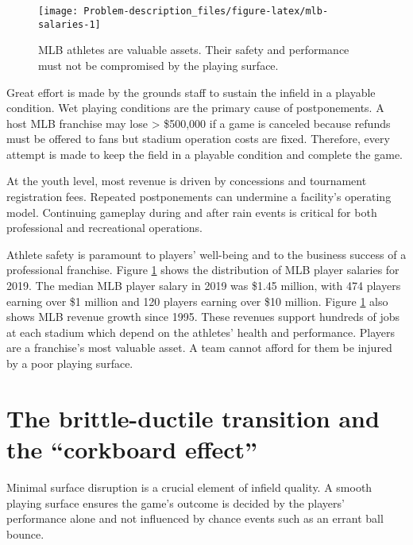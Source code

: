 \documentclass[
  letterpaper,
  openany]{book}
\begin{document}
\begin{figure}

{\centering \texttt{[image: Problem-description\_files/figure-latex/mlb-salaries-1]} 

}

\caption[Financial implications of infield safety]{MLB athletes are valuable assets. Their safety and performance must not be compromised by the playing surface.}\label{fig:mlb-salaries}
\end{figure}

Great effort is made by the grounds staff to sustain the infield in a playable condition.
Wet playing conditions are the primary cause of postponements.
A host MLB franchise may lose \textgreater{} \$500,000 if a game is canceled because refunds must be offered to fans but stadium operation costs are fixed.
Therefore, every attempt is made to keep the field in a playable condition and complete the game.

At the youth level, most revenue is driven by concessions and tournament registration fees.
Repeated postponements can undermine a facility's operating model.
Continuing gameplay during and after rain events is critical for both professional and recreational operations.

Athlete safety is paramount to players' well-being and to the business success of a professional franchise.
Figure \ref{fig:mlb-salaries} shows the distribution of MLB player salaries for 2019.
The median MLB player salary in 2019 was \$1.45 million, with 474 players earning over \$1 million and 120 players earning over \$10 million.
Figure \ref{fig:mlb-salaries} also shows MLB revenue growth since 1995.
These revenues support hundreds of jobs at each stadium which depend on the athletes' health and performance.
Players are a franchise's most valuable asset. A team cannot afford for them be injured by a poor playing surface.

\hypertarget{corkboard-effect-section}{%
\section{The brittle-ductile transition and the ``corkboard effect''}\label{corkboard-effect-section}}

Minimal surface disruption is a crucial element of infield quality.
A smooth playing surface ensures the game's outcome is decided by the players' performance alone and not influenced by chance events such as an errant ball bounce.
\end{document}
